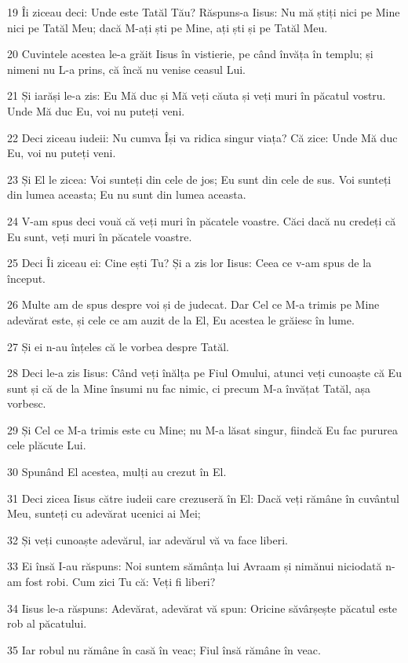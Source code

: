 \par 19 Îi ziceau deci: Unde este Tatăl Tău? Răspuns-a Iisus: Nu mă știți nici pe Mine nici pe Tatăl Meu; dacă M-ați ști pe Mine, ați ști și pe Tatăl Meu.
\par 20 Cuvintele acestea le-a grăit Iisus în vistierie, pe când învăța în templu; și nimeni nu L-a prins, că încă nu venise ceasul Lui.
\par 21 Și iarăși le-a zis: Eu Mă duc și Mă veți căuta și veți muri în păcatul vostru. Unde Mă duc Eu, voi nu puteți veni.
\par 22 Deci ziceau iudeii: Nu cumva Își va ridica singur viața? Că zice: Unde Mă duc Eu, voi nu puteți veni.
\par 23 Și El le zicea: Voi sunteți din cele de jos; Eu sunt din cele de sus. Voi sunteți din lumea aceasta; Eu nu sunt din lumea aceasta.
\par 24 V-am spus deci vouă că veți muri în păcatele voastre. Căci dacă nu credeți că Eu sunt, veți muri în păcatele voastre.
\par 25 Deci Îi ziceau ei: Cine ești Tu? Și a zis lor Iisus: Ceea ce v-am spus de la început.
\par 26 Multe am de spus despre voi și de judecat. Dar Cel ce M-a trimis pe Mine adevărat este, și cele ce am auzit de la El, Eu acestea le grăiesc în lume.
\par 27 Și ei n-au înțeles că le vorbea despre Tatăl.
\par 28 Deci le-a zis Iisus: Când veți înălța pe Fiul Omului, atunci veți cunoaște că Eu sunt și că de la Mine însumi nu fac nimic, ci precum M-a învățat Tatăl, așa vorbesc.
\par 29 Și Cel ce M-a trimis este cu Mine; nu M-a lăsat singur, fiindcă Eu fac pururea cele plăcute Lui.
\par 30 Spunând El acestea, mulți au crezut în El.
\par 31 Deci zicea Iisus către iudeii care crezuseră în El: Dacă veți rămâne în cuvântul Meu, sunteți cu adevărat ucenici ai Mei;
\par 32 Și veți cunoaște adevărul, iar adevărul vă va face liberi.
\par 33 Ei însă I-au răspuns: Noi suntem sămânța lui Avraam și nimănui niciodată n-am fost robi. Cum zici Tu că: Veți fi liberi?
\par 34 Iisus le-a răspuns: Adevărat, adevărat vă spun: Oricine săvârșește păcatul este rob al păcatului.
\par 35 Iar robul nu rămâne în casă în veac; Fiul însă rămâne în veac.

